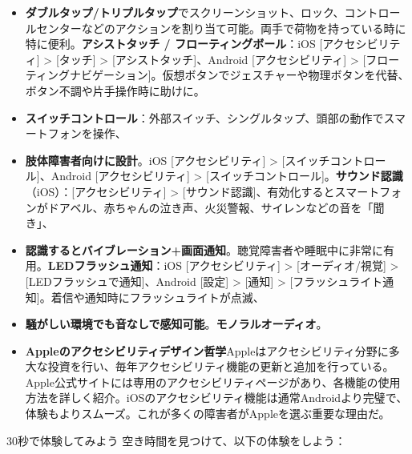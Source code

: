 
\begin{itemize}
  \item \textbf{ダブルタップ/トリプルタップ}でスクリーンショット、ロック、コントロールセンターなどのアクションを割り当て可能。両手で荷物を持っている時に特に便利。\textbf{アシストタッチ / フローティングボール}：iOS [アクセシビリティ] > [タッチ] > [アシストタッチ]、Android [アクセシビリティ] > [フローティングナビゲーション]。仮想ボタンでジェスチャーや物理ボタンを代替、ボタン不調や片手操作時に助けに。
  \item \textbf{スイッチコントロール}：外部スイッチ、シングルタップ、頭部の動作でスマートフォンを操作、
  \item \textbf{肢体障害者向けに設計}。iOS [アクセシビリティ] > [スイッチコントロール]、Android [アクセシビリティ] > [スイッチコントロール]。\textbf{サウンド認識}（iOS）：[アクセシビリティ] > [サウンド認識]、有効化するとスマートフォンがドアベル、赤ちゃんの泣き声、火災警報、サイレンなどの音を「聞き」、
  \item \textbf{認識するとバイブレーション+画面通知}。聴覚障害者や睡眠中に非常に有用。\textbf{LEDフラッシュ通知}：iOS [アクセシビリティ] > [オーディオ/視覚] > [LEDフラッシュで通知]、Android [設定] > [通知] > [フラッシュライト通知]。着信や通知時にフラッシュライトが点滅、
  \item \textbf{騒がしい環境でも音なしで感知可能}。\textbf{モノラルオーディオ}。
  \item \textbf{Appleのアクセシビリティデザイン哲学}Appleはアクセシビリティ分野に多大な投資を行い、毎年アクセシビリティ機能の更新と追加を行っている。Apple公式サイトには専用のアクセシビリティページがあり、各機能の使用方法を詳しく紹介。iOSのアクセシビリティ機能は通常Androidより完璧で、体験もよりスムーズ。これが多くの障害者がAppleを選ぶ重要な理由だ。
\end{itemize}

\begin{tcbinfo}{30秒で体験してみよう}
空き時間を見つけて、以下の体験をしよう：

\end{tcbinfo}

